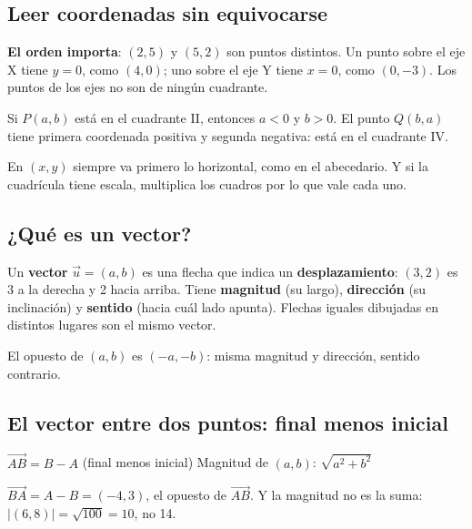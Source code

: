 \subsection{Leer coordenadas sin equivocarse}
\textbf{El orden importa}: $(2, 5)$ y $(5, 2)$ son puntos distintos. Un punto sobre el eje X tiene $y = 0$, como $(4, 0)$; uno sobre el eje Y tiene $x = 0$, como $(0, -3)$. Los puntos de los ejes no son de ningún cuadrante.
\begin{ejemplo} Si $P(a, b)$ está en el cuadrante II, entonces $a < 0$ y $b > 0$. El punto $Q(b, a)$ tiene primera coordenada positiva y segunda negativa: está en el cuadrante IV.\end{ejemplo}
\begin{ojo}[Primero la $x$] En $(x, y)$ siempre va primero lo horizontal, como en el abecedario. Y si la cuadrícula tiene escala, multiplica los cuadros por lo que vale cada uno.\end{ojo}

\subsection{¿Qué es un vector?}
Un \textbf{vector} $\vec{u} = (a, b)$ es una flecha que indica un \textbf{desplazamiento}: $(3, 2)$ es 3 a la derecha y 2 hacia arriba. Tiene \textbf{magnitud} (su largo), \textbf{dirección} (su inclinación) y \textbf{sentido} (hacia cuál lado apunta). Flechas iguales dibujadas en distintos lugares son el mismo vector.
\begin{clave} El opuesto de $(a, b)$ es $(-a, -b)$: misma magnitud y dirección, sentido contrario.\end{clave}

\subsection{El vector entre dos puntos: final menos inicial}
\begin{clave}[Vector de $A$ a $B$] $\overrightarrow{AB} = B - A$ (final menos inicial) \qquad Magnitud de $(a, b)$: $\sqrt{a^2 + b^2}$\end{clave}
\begin{ojo} $\overrightarrow{BA} = A - B = (-4, 3)$, el opuesto de $\overrightarrow{AB}$. Y la magnitud no es la suma: $|(6, 8)| = \sqrt{100} = 10$, no 14.\end{ojo}

